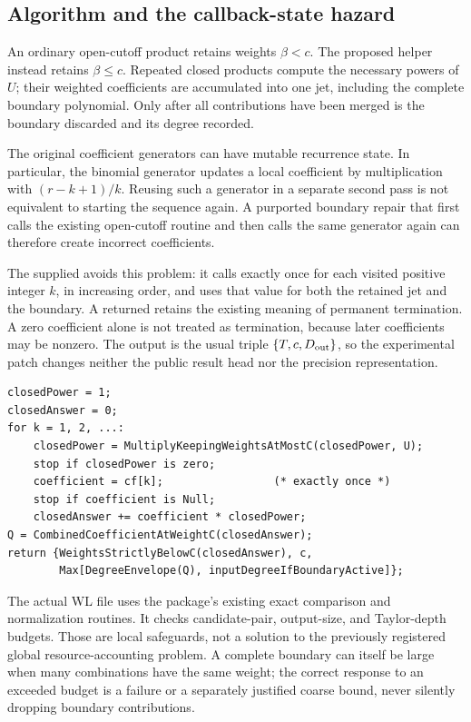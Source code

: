 \documentclass[11pt,a4paper]{article}
\newcommand{\code}[1]{\texttt{\detokenize{#1}}}
\begin{document}
\subsection{Algorithm and the callback-state hazard}
An ordinary open-cutoff product retains weights \(\beta<c\). The proposed helper instead retains \(\beta\le c\). Repeated closed products compute the necessary powers of \(U\); their weighted coefficients are accumulated into one jet, including the complete boundary polynomial. Only after all contributions have been merged is the boundary discarded and its degree recorded.

The original coefficient generators can have mutable recurrence state. In particular, the binomial generator updates a local coefficient by multiplication with \((r-k+1)/k\). Reusing such a generator in a separate second pass is not equivalent to starting the sequence again. A purported boundary repair that first calls the existing open-cutoff routine and then calls the same generator again can therefore create incorrect coefficients.\cite{main}

The supplied \code{ClosedBoundaryPatch.wl} avoids this problem: it calls \code{cf[k]} exactly once for each visited positive integer \(k\), in increasing order, and uses that value for both the retained jet and the boundary. A returned \code{Null} retains the existing meaning of permanent termination. A zero coefficient alone is not treated as termination, because later coefficients may be nonzero. The output is the usual triple \(\{T,c,D_{\rm out}\}\), so the experimental patch changes neither the public result head nor the precision representation.

\begin{lstlisting}
closedPower = 1;
closedAnswer = 0;
for k = 1, 2, ...:
    closedPower = MultiplyKeepingWeightsAtMostC(closedPower, U);
    stop if closedPower is zero;
    coefficient = cf[k];                 (* exactly once *)
    stop if coefficient is Null;
    closedAnswer += coefficient * closedPower;
Q = CombinedCoefficientAtWeightC(closedAnswer);
return {WeightsStrictlyBelowC(closedAnswer), c,
        Max[DegreeEnvelope(Q), inputDegreeIfBoundaryActive]};
\end{lstlisting}

The actual WL file uses the package's existing exact comparison and normalization routines. It checks candidate-pair, output-size, and Taylor-depth budgets. Those are local safeguards, not a solution to the previously registered global resource-accounting problem. A complete boundary can itself be large when many combinations have the same weight; the correct response to an exceeded budget is a failure or a separately justified coarse bound, never silently dropping boundary contributions.
\end{document}
